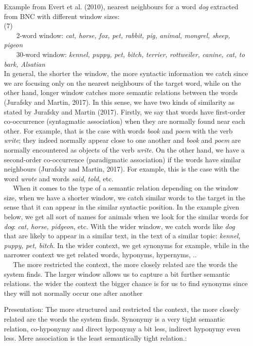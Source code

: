 \documentclass[11pt]{article}
\begin{document}
Example from Evert et al. (2010), nearest neighbours for a word
\emph{dog} extracted from BNC with different window sizes:\\
(7)\\
    2-word window: \emph{cat, horse, fox, pet, rabbit, pig, animal,
mongrel, sheep, pigeon}\\
    30-word window: \emph{kennel, puppy, pet, bitch, terrier,
rottweiler, canine, cat, to bark, Alsatian}\\
 In general, the shorter the window, the more syntactic information we
catch since we are focusing only on the nearest neighbours of the target
word, while on the other hand, longer window catches more semantic
relations between the words (Jurafsky and Martin, 2017). In this sense,
we have two kinds of similarity as stated by Jurafsky and Martin (2017).
Firstly, we say that words have first-order co-occurrence (syntagmatic
association) when they are normally found near each other. For example,
that is the case with words \emph{book} and \emph{poem} with the verb
\emph{write}; they indeed normally appear close to one another and
\emph{book} and \emph{poem} are normally encountered as objects of the
verb \emph{write}. On the other hand, we have a second-order
co-occurrence (paradigmatic association) if the words have similar
neighbours (Jurafsky and Martin, 2017). For example, this is the case
with the word \emph{wrote} and words \emph{said}, \emph{told}, etc.\\
   When it comes to the type of a semantic relation depending on the
window size, when we have a shorter window, we catch similar words to
the target in the sense that it can appear in the similar syntactic
position. In the example given below, we get all sort of names for
animals when we look for the similar words for \emph{dog}: \emph{cat,
horse, pidgeon}, etc. With the wider window, we catch words like
\emph{dog} that are likely to appear in a similar text, in the text of a
similar topic: \emph{kennel, puppy, pet, bitch}. In the wider context,
we get synonyms for example, while in the narrower context we get
related words, hyponyms, hypernyms, ..\\
   The more restricted the context, the more closely related are the
words the system finds. The larger window allows us to capture a bit
further semantic relations. the wider the context the bigger chance is
for us to find synonyms since they will not normally occur one after
another

Presentation: The more structured and restricted the context, the more
closely related are the words the system finds. Synonymy is a very tight
semantic relation, co-hyponymy and direct hyponymy a bit less, indirect
hyponymy even less. Mere association is the least semantically tight
relation.:
\end{document}
